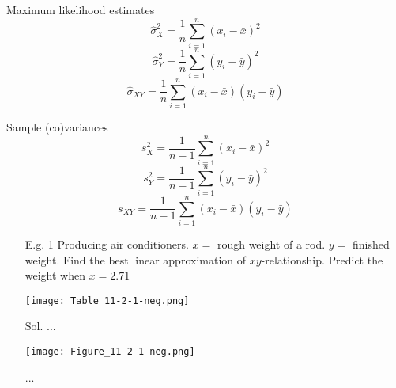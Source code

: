 \begin{frame}[fragile]
	\begin{minipage}{0.45\textwidth}
		\begin{center}
			Maximum likelihood estimates
			\[ \hat{\sigma}_X^2 =  \frac{1}{n}\sum_{i=1}^n \left(x_i-\bar x \right)^2
			\]
			\[
			 \hat{\sigma}_Y^2 =  \frac{1}{n}\sum_{i=1}^n \left(y_i-\bar y \right)^2
			 \]\[
		 \hat{\sigma}_{XY}= \frac{1}{n}\sum_{i=1}^n \left(x_i-\bar x \right)\left(y_i-\bar y \right)
		 \]
		\end{center}
	\end{minipage}
	\hfill
	\begin{minipage}{0.45\textwidth}
		\begin{center}
			Sample (co)variances
			\[ s_X^2 =  \frac{1}{n-1}\sum_{i=1}^n \left(x_i-\bar x \right)^2
			\]
			\[
			 s_Y^2 =  \frac{1}{n-1}\sum_{i=1}^n \left(y_i-\bar y \right)^2
			 \]\[
		 s_{XY}= \frac{1}{n-1}\sum_{i=1}^n \left(x_i-\bar x \right)\left(y_i-\bar y \right)
		 \]
		\end{center}
	\end{minipage}
\end{frame}
\begin{frame}
\begin{enumerate}
\item[E.g. 1] Producing air conditioners. $x=$ rough weight of a rod. $y=$ finished weight.
Find the best linear approximation of $xy$-relationship.
Predict the weight when $x=2.71$
\\[1em]
\begin{center}
\texttt{[image: Table\_11-2-1-neg.png]}
\end{center}
\end{enumerate}
\end{frame}
\begin{frame}

\begin{enumerate}
\item[Sol.] ...\\[1em]
\vfill
\begin{center}
\texttt{[image: Figure\_11-2-1-neg.png]}
\end{center}
\vfill
... \myEnd
\end{enumerate}
\end{frame}
